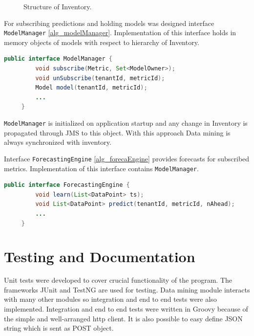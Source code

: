     \begin{figure}[H]
        \begin{center}
            \caption{Structure of Inventory.}
            \label{img_inventory}
        \end{center}
    \end{figure}

    For subscribing predictions and holding models was designed interface
    \texttt{ModelManager} \ref{alg_modelManager}. 
    Implementation of this interface holds in memory 
    objects of models with respect to hierarchy of Inventory.

    \begin{lstlisting}[caption={Interface Model Manager}, language=Java, label={alg_modelManager}]
     public interface ModelManager {
         void subscribe(Metric, Set<ModelOwner>);
         void unSubscribe(tenantId, metricId);
         Model model(tenantId, metricId);
         ...
     }
    \end{lstlisting}

    \texttt{ModelManager} is initialized on application startup and any change in
    Inventory is propagated through JMS to this object. With this approach Data mining is
    always synchronized with inventory. 

    Interface \texttt{ForecastingEngine} \ref{alg_forecaEngine} provides forecasts for
    subscribed metrics. Implementation of this interface contains \texttt{ModelManager}.
    
    \begin{lstlisting}[caption={Interface Forecasting Engine}, language=Java, label={alg_forecaEngine}]
     public interface ForecastingEngine {
         void learn(List<DataPoint> ts);
         void List<DataPoint> predict(tenantId, metricId, nAhead);
         ...
     }
    \end{lstlisting}

    \section{Testing and Documentation}
    Unit tests were developed to cover crucial functionality of the program. The
    frameworks JUnit and TestNG are used for testing. Data mining module interacts with many other modules so
    integration and end to end tests were also implemented. Integration and end to end
    tests were written in Groovy because of the simple and well-arranged http client. It
    is also possible to easy define JSON string which is sent as POST object.

